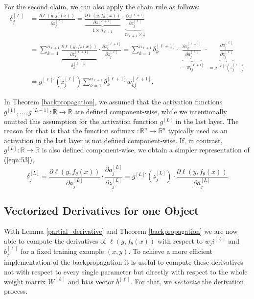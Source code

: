 For the second claim, we can also apply the chain rule as follows:
\begin{equation}
    \begin{aligned}
    \delta_{j}^{[\ell]} &= \frac{\partial \ell (y, f_{\theta} (x))}{\partial z_{j}^{[\ell]}} = \underbrace{\frac{\partial \ell (y, f_{\theta} (x))}{\partial z^{[\ell+1]}}}_{1 \times n_{\ell + 1}} \cdot \underbrace{\frac{\partial z^{[\ell+1]}}{\partial z_{j}^{[\ell]}}}_{n_{\ell + 1} \times 1}\\
    &= \sum_{k=1}^{n_{\ell+1}} \underbrace{\frac{\partial \ell (y, f_\theta (x))}{\partial z_{k}^{[\ell+1]}}}_{\delta_k^{[\ell + 1]}} \cdot \frac{\partial z_{k}^{[\ell+1]}}{\partial z_{j}^{[\ell]}} = \sum_{k=1}^{n_{\ell+1}} \delta_{k}^{[\ell+1]} \cdot \underbrace{\frac{\partial z_{k}^{[\ell+1]}}{\partial a_{j}^{[\ell]}}}_{=w_{kj}^{[\ell + 1]}} \cdot \underbrace{\frac{\partial a_{j}^{[\ell]}}{\partial z_{j}^{[\ell]}}}_{=g^{[\ell]'} \left( z_{j}^{[\ell]} \right)}\\
    &= g^{[\ell]'} \left( z_{j}^{[\ell]} \right) \sum_{k=1}^{n_{\ell+1}} \delta_{k}^{[\ell+1]} w_{kj}^{[\ell+1]}.
    \end{aligned}
    \label{eqn:56}
\end{equation}

\begin{remark}
In Theorem \ref{backpropagation}, we assumed that the activation functions $g^{[1]}, \ldots, g^{[L-1]}: \mathbb{R} \rightarrow \mathbb{R}$ are defined component-wise, while we intentionally
omitted this assumption for the activation function $g^{[L]}$ in the last layer. The reason for that is that the function $\text{softmax }: \mathbb{R}^n \rightarrow \mathbb{R}^n$ typically used as an activation in the last layer is not defined component-wise. If, in contrast, $g^{[L]}: \mathbb{R} \rightarrow \mathbb{R}$ is also defined component-wise, we obtain a simpler representation of (\ref{eqn:53}),
\begin{equation}
    \delta_j^{[L]} = \frac{\partial \ell(y, f_\theta(x))}{\partial a_j^{[L]}} \cdot \frac{\partial a_j^{[L]}}{\partial z_j^{[L]}} = g^{[L]'} \left( z_{j}^{[L]} \right) \cdot \frac{\partial \ell(y, f_\theta(x))}{\partial a_j^{[L]}}
    \label{eqn:57}
\end{equation}
\end{remark}

\subsection{Vectorized Derivatives for one Object}
With Lemma \ref{partial_derivative} and Theorem \ref{backpropagation} we are now able to compute the derivatives of $\ell(y, f_\theta(x))$ with respect to $w_ji^{[\ell]}$ and $b_j^{[\ell]}$ for a fixed training example $(x, y)$. To achieve a more efficient implementation of the backpropagation it is useful to compute these derivatives not with respect to every single parameter but directly with respect to the whole weight matrix $W^{[\ell]}$ and bias vector $b^{[\ell]}$. For that, we \emph{vectorize} the derivation process.

